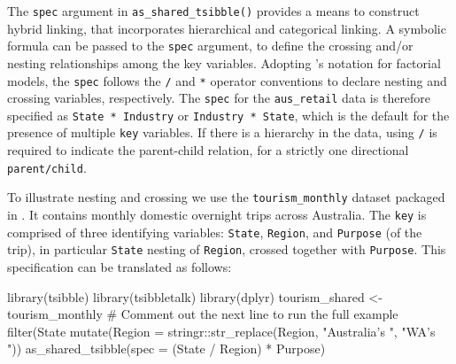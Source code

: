 The \texttt{spec} argument in \texttt{as\_shared\_tsibble()} provides a
means to construct hybrid linking, that incorporates hierarchical and
categorical linking. A symbolic formula can be passed to the
\texttt{spec} argument, to define the crossing and/or nesting
relationships among the key variables. Adopting \citet{Wilkinson1973}'s
notation for factorial models, the \texttt{spec} follows the \texttt{/}
and \texttt{*} operator conventions to declare nesting and crossing
variables, respectively. The \texttt{spec} for the \texttt{aus\_retail}
data is therefore specified as \texttt{State\ *\ Industry} or
\texttt{Industry\ *\ State}, which is the default for the presence of
multiple \texttt{key} variables. If there is a hierarchy in the data,
using \texttt{/} is required to indicate the parent-child relation, for
a strictly one directional \texttt{parent/child}.

To illustrate nesting and crossing we use the \texttt{tourism\_monthly}
dataset \citep{tourism} packaged in . It contains
monthly domestic overnight trips across Australia. The \texttt{key} is
comprised of three identifying variables: \texttt{State},
\texttt{Region}, and \texttt{Purpose} (of the trip), in particular
\texttt{State} nesting of \texttt{Region}, crossed together with
\texttt{Purpose}. This specification can be translated as follows:

\begin{Schunk}
\begin{Sinput}
library(tsibble)
library(tsibbletalk)
library(dplyr)
tourism_shared <- tourism_monthly %
  # Comment out the next line to run the full example
  filter(State %
  mutate(Region = stringr::str_replace(Region, "Australia's ", "WA's ")) %
  as_shared_tsibble(spec = (State / Region) * Purpose)
\end{Sinput}
\end{Schunk}

